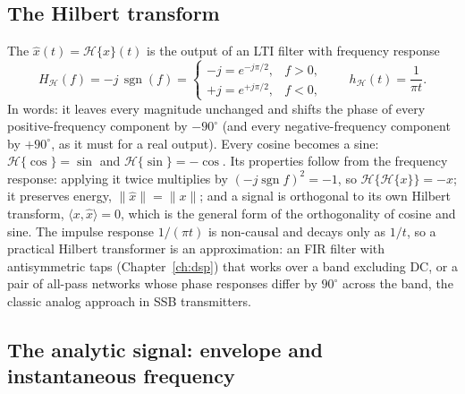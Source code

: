 \subsection{The Hilbert transform}

The  $\hat x(t)=\mathcal H\{x\}(t)$ is the output of an LTI filter with
frequency response
\begin{equation}
H_{\mathcal H}(f)=-j\,\operatorname{sgn}(f)=\begin{cases}-j=e^{-j\pi/2},&f>0,\\ +j=e^{+j\pi/2},&f<0,\end{cases}
\qquad h_{\mathcal H}(t)=\frac{1}{\pi t}.
\label{eq:ch02:hilbert}
\end{equation}
In words: it leaves every magnitude unchanged and shifts the phase of every positive-frequency
component by $-90^\circ$ (and every negative-frequency component by $+90^\circ$, as it must for a real
output). Every cosine becomes a sine: $\mathcal H\{\cos\}=\sin$ and $\mathcal H\{\sin\}=-\cos$. Its
properties follow from the frequency response: applying it twice multiplies by
$(-j\operatorname{sgn}f)^2=-1$, so $\mathcal H\{\mathcal H\{x\}\}=-x$; it preserves energy,
$\|\hat x\|=\|x\|$; and a signal is orthogonal to its own Hilbert transform,
$\langle x,\hat x\rangle=0$, which is the general form of the orthogonality of cosine and sine. The
impulse response $1/(\pi t)$ is non-causal and decays only as $1/t$, so a practical Hilbert
transformer is an approximation: an FIR filter with antisymmetric taps (Chapter~\ref{ch:dsp}) that
works over a band excluding DC, or a pair of all-pass networks whose phase responses differ by
$90^\circ$ across the band, the classic analog approach in SSB transmitters.

\subsection{The analytic signal: envelope and instantaneous frequency}

